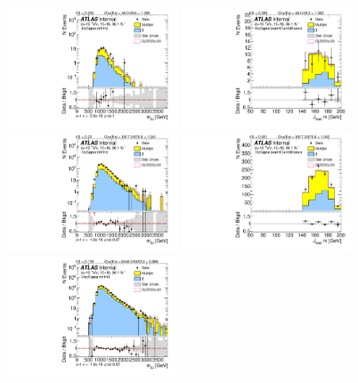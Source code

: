 \begin{figure}[htbp!]
\begin{center}
\includegraphics[width=0.45\textwidth,angle=-90]{figures/boosted/TT/Moriond_TT_FourTag_Signal_mHH_l_1.pdf}
\includegraphics[width=0.45\textwidth,angle=-90]{figures/boosted/TT/Moriond_TT_FourTag_Signal_leadHCand_Mass_s.pdf}\\
\includegraphics[width=0.45\textwidth,angle=-90]{figures/boosted/TT/Moriond_TT_ThreeTag_Signal_mHH_l_1.pdf}
\includegraphics[width=0.45\textwidth,angle=-90]{figures/boosted/TT/Moriond_TT_ThreeTag_Signal_leadHCand_Mass_s.pdf}\\
\includegraphics[width=0.45\textwidth,angle=-90]{figures/boosted/TT/Moriond_TT_TwoTag_split_Signal_mHH_l_1.pdf}

\end{center}
\end{figure}
